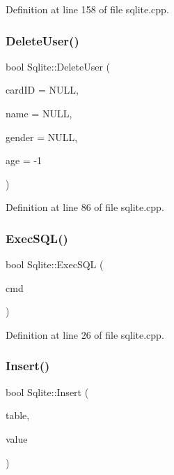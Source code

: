 Definition at line 158 of file sqlite.\+cpp.

\mbox{\label{class_sqlite_af2b581d800d01e1f1281d98ec1341ddd}} 
\subsubsection{\texorpdfstring{DeleteUser()}{DeleteUser()}}
{\footnotesize\ttfamily bool Sqlite\+::\+Delete\+User (\begin{DoxyParamCaption}\item[{Q\+String}]{card\+ID = {\ttfamily NULL},  }\item[{Q\+String}]{name = {\ttfamily NULL},  }\item[{Q\+String}]{gender = {\ttfamily NULL},  }\item[{int}]{age = {\ttfamily -\/1} }\end{DoxyParamCaption})}



Definition at line 86 of file sqlite.\+cpp.

\mbox{\label{class_sqlite_a3d4be952cdb19b674a80dacd78e2873a}} 
\subsubsection{\texorpdfstring{ExecSQL()}{ExecSQL()}}
{\footnotesize\ttfamily bool Sqlite\+::\+Exec\+S\+QL (\begin{DoxyParamCaption}\item[{Q\+String}]{cmd }\end{DoxyParamCaption})}



Definition at line 26 of file sqlite.\+cpp.

\mbox{\label{class_sqlite_a8d0c32df6db2b0ca13695cfa8780840e}} 
\subsubsection{\texorpdfstring{Insert()}{Insert()}}
{\footnotesize\ttfamily bool Sqlite\+::\+Insert (\begin{DoxyParamCaption}\item[{Q\+String}]{table,  }\item[{Q\+String}]{value }\end{DoxyParamCaption})}



